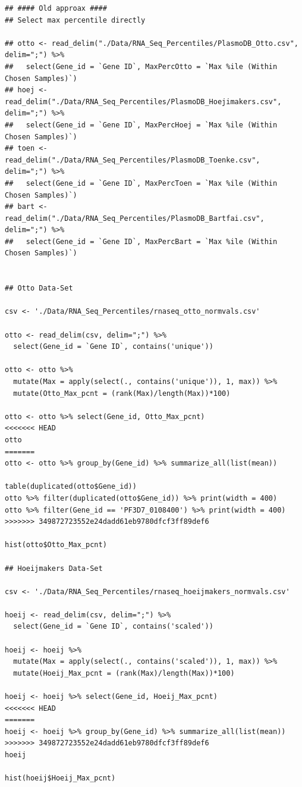 \documentclass[11pt]{article}
\begin{document}
\begin{verbatim}
## #### Old approax ####
## Select max percentile directly

## otto <- read_delim("./Data/RNA_Seq_Percentiles/PlasmoDB_Otto.csv", delim=";") %>%
##   select(Gene_id = `Gene ID`, MaxPercOtto = `Max %ile (Within Chosen Samples)`)
## hoej <- read_delim("./Data/RNA_Seq_Percentiles/PlasmoDB_Hoejimakers.csv", delim=";") %>%
##   select(Gene_id = `Gene ID`, MaxPercHoej = `Max %ile (Within Chosen Samples)`)
## toen <- read_delim("./Data/RNA_Seq_Percentiles/PlasmoDB_Toenke.csv", delim=";") %>%
##   select(Gene_id = `Gene ID`, MaxPercToen = `Max %ile (Within Chosen Samples)`)
## bart <- read_delim("./Data/RNA_Seq_Percentiles/PlasmoDB_Bartfai.csv", delim=";") %>%
##   select(Gene_id = `Gene ID`, MaxPercBart = `Max %ile (Within Chosen Samples)`)


## Otto Data-Set

csv <- './Data/RNA_Seq_Percentiles/rnaseq_otto_normvals.csv'

otto <- read_delim(csv, delim=";") %>%
  select(Gene_id = `Gene ID`, contains('unique'))

otto <- otto %>%
  mutate(Max = apply(select(., contains('unique')), 1, max)) %>%
  mutate(Otto_Max_pcnt = (rank(Max)/length(Max))*100)

otto <- otto %>% select(Gene_id, Otto_Max_pcnt)
<<<<<<< HEAD
otto
=======
otto <- otto %>% group_by(Gene_id) %>% summarize_all(list(mean))

table(duplicated(otto$Gene_id))
otto %>% filter(duplicated(otto$Gene_id)) %>% print(width = 400)
otto %>% filter(Gene_id == 'PF3D7_0108400') %>% print(width = 400)
>>>>>>> 349872723552e24dadd61eb9780dfcf3ff89def6

hist(otto$Otto_Max_pcnt)

## Hoeijmakers Data-Set

csv <- './Data/RNA_Seq_Percentiles/rnaseq_hoeijmakers_normvals.csv'

hoeij <- read_delim(csv, delim=";") %>%
  select(Gene_id = `Gene ID`, contains('scaled'))

hoeij <- hoeij %>%
  mutate(Max = apply(select(., contains('scaled')), 1, max)) %>%
  mutate(Hoeij_Max_pcnt = (rank(Max)/length(Max))*100)

hoeij <- hoeij %>% select(Gene_id, Hoeij_Max_pcnt)
<<<<<<< HEAD
=======
hoeij <- hoeij %>% group_by(Gene_id) %>% summarize_all(list(mean))
>>>>>>> 349872723552e24dadd61eb9780dfcf3ff89def6
hoeij

hist(hoeij$Hoeij_Max_pcnt)


\end{verbatim}
\end{document}
